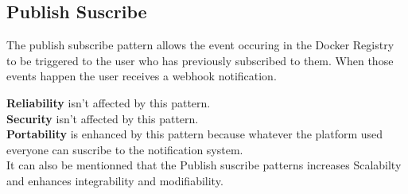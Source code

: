 \subsection{Publish Suscribe}

The publish subscribe pattern allows the event occuring in the Docker Registry to be triggered to the user who has previously subscribed to them. When those events happen the user receives a webhook notification.

\textbf{Reliability} isn't affected by this pattern. \\
\textbf{Security} isn't affected by this pattern.\\
\textbf{Portability} is enhanced by this pattern because whatever the platform used everyone can suscribe to the notification system.\\

It can also be mentionned that the Publish suscribe patterns increases Scalabilty and enhances integrability and modifiability.

